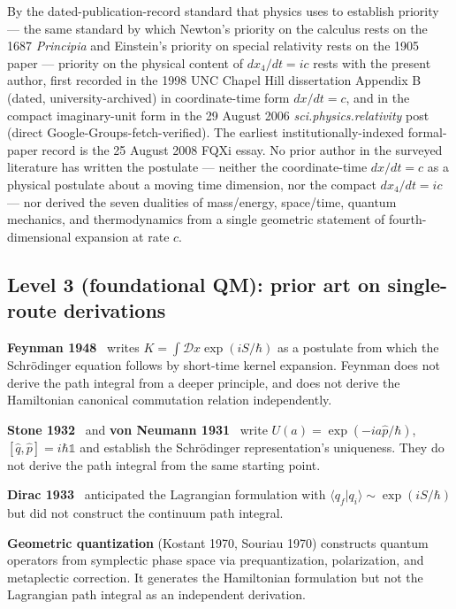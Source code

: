 \documentclass[11pt,a4paper]{article}
\begin{document}
By the dated-publication-record standard that physics uses to establish priority --- the same standard by which Newton's priority on the calculus rests on the 1687 \emph{Principia} and Einstein's priority on special relativity rests on the 1905 paper --- priority on the physical content of $dx_4/dt = ic$ rests with the present author, first recorded in the 1998 UNC Chapel Hill dissertation Appendix B (dated, university-archived) in coordinate-time form $dx/dt = c$, and in the compact imaginary-unit form in the 29 August 2006 \emph{sci.physics.relativity} post (direct Google-Groups-fetch-verified). The earliest institutionally-indexed formal-paper record is the 25 August 2008 FQXi essay. No prior author in the surveyed literature has written the postulate --- neither the coordinate-time $dx/dt = c$ as a physical postulate about a moving time dimension, nor the compact $dx_4/dt = ic$ --- nor derived the seven dualities of mass/energy, space/time, quantum mechanics, and thermodynamics from a single geometric statement of fourth-dimensional expansion at rate $c$.

\subsection{Level 3 (foundational QM): prior art on single-route derivations}

\textbf{Feynman 1948}~\cite{feynman1948} writes $K = \int \mathcal{D}x \exp(iS/\hbar)$ as a postulate from which the Schr\"odinger equation follows by short-time kernel expansion. Feynman does not derive the path integral from a deeper principle, and does not derive the Hamiltonian canonical commutation relation independently.

\textbf{Stone 1932}~\cite{stone1932} and \textbf{von Neumann 1931}~\cite{vonneumann1931} write $U(a) = \exp(-ia\hat{p}/\hbar)$, $[\hat{q}, \hat{p}] = i\hbar \mathbb{1}$ and establish the Schr\"odinger representation's uniqueness. They do not derive the path integral from the same starting point.

\textbf{Dirac 1933}~\cite{dirac1933} anticipated the Lagrangian formulation with $\langle q_f | q_i \rangle \sim \exp(iS/\hbar)$ but did not construct the continuum path integral.

\textbf{Geometric quantization} (Kostant 1970, Souriau 1970) constructs quantum operators from symplectic phase space via prequantization, polarization, and metaplectic correction. It generates the Hamiltonian formulation but not the Lagrangian path integral as an independent derivation.
\end{document}
